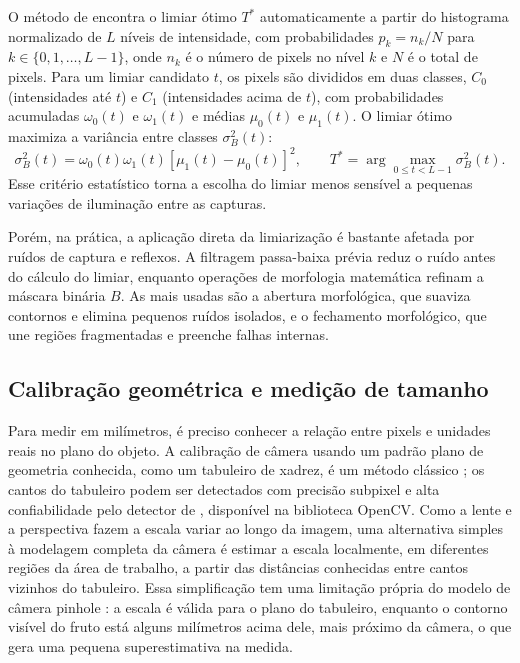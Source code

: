 O método de \textcite{otsu1979} encontra o limiar ótimo \(T^{*}\) automaticamente a partir do histograma normalizado de \(L\) níveis de intensidade, com probabilidades \(p_k = n_k / N\) para \(k \in \{0, 1, \dots, L-1\}\), onde \(n_{k}\) é o número de pixels no nível \(k\) e \(N\) é o total de pixels. Para um limiar candidato \(t\), os pixels são divididos em duas classes, \(C_0\) (intensidades até \(t\)) e \(C_1\) (intensidades acima de \(t\)), com probabilidades acumuladas \(\omega_0(t)\) e \(\omega_1(t)\) e médias \(\mu_0(t)\) e \(\mu_1(t)\). O limiar ótimo maximiza a variância entre classes \(\sigma_B^2(t)\):
\[
\sigma_{B}^{2}(t) = \omega_{0}(t)\omega_{1}(t)\left[\mu_{1}(t)-\mu_{0}(t)\right]^{2},
\qquad T^{*} = \arg\max_{0 \le t < L-1} \sigma_{B}^{2}(t).
\]
Esse critério estatístico torna a escolha do limiar menos sensível a pequenas variações de iluminação entre as capturas.

Porém, na prática, a aplicação direta da limiarização é bastante afetada por ruídos de captura e reflexos. A filtragem passa-baixa prévia reduz o ruído antes do cálculo do limiar, enquanto operações de morfologia matemática refinam a máscara binária \(B\). As mais usadas são a abertura morfológica, que suaviza contornos e elimina pequenos ruídos isolados, e o fechamento morfológico, que une regiões fragmentadas e preenche falhas internas.

\subsection{Calibração geométrica e medição de tamanho}

Para medir em milímetros, é preciso conhecer a relação entre pixels e unidades reais no plano do objeto. A calibração de câmera usando um padrão plano de geometria conhecida, como um tabuleiro de xadrez, é um método clássico \cite{zhang2000}; os cantos do tabuleiro podem ser detectados com precisão subpixel e alta confiabilidade pelo detector de \textcite{duda2018}, disponível na biblioteca OpenCV. Como a lente e a perspectiva fazem a escala variar ao longo da imagem, uma alternativa simples à modelagem completa da câmera é estimar a escala localmente, em diferentes regiões da área de trabalho, a partir das distâncias conhecidas entre cantos vizinhos do tabuleiro. Essa simplificação tem uma limitação própria do modelo de câmera pinhole \cite{zhang2000}: a escala é válida para o plano do tabuleiro, enquanto o contorno visível do fruto está alguns milímetros acima dele, mais próximo da câmera, o que gera uma pequena superestimativa na medida.

